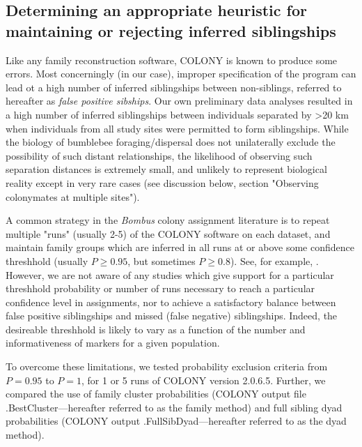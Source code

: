 \documentclass[12pt]{article}
\begin{document}
\subsection{Determining an appropriate heuristic for maintaining or rejecting inferred siblingships}

Like any family reconstruction software, COLONY is known to produce some errors. Most concerningly (in our case), improper specification of the program can lead ot a high number of inferred siblingships between non-siblings, referred to hereafter as \emph{false positive sibships}. Our own preliminary data analyses resulted in a high number of inferred siblingships between individuals separated by >20 km when individuals from all study sites were permitted to form siblingships. While the biology of bumblebee foraging/dispersal does not unilaterally exclude the possibility of such distant relationships, the likelihood of observing such separation distances is extremely small, and unlikely to represent biological reality except in very rare cases (see discussion below, section "Observing colonymates at multiple sites").

A common strategy in the \emph{Bombus} colony assignment literature is to repeat multiple "runs" (usually 2-5) of the COLONY software on each dataset, and maintain family groups which are inferred in all runs at or above some confidence threshhold (usually $P \ge 0.95$, but sometimes $P \ge 0.8$). See, for example, \textcite{carvellMolecularSpatialAnalyses2012, raoBumbleBeeHymenoptera2012, dreierFinescaleSpatialGenetic2014a, geibBumbleBeeNest2015a, carvellBumblebeeFamilyLineage2017a, molaWildfireRevealsTransient2020a}. However, we are not aware of any studies which give support for a particular threshhold probability or number of runs necessary to reach a particular confidence level in assignments, nor to achieve a satisfactory balance between false positive siblingships and missed (false negative) siblingships. Indeed, the desireable threshhold is likely to vary as a function of the number and informativeness of markers for a given population.

To overcome these limitations, we tested probability exclusion criteria from $P = 0.95$ to $P = 1$, for 1 or 5 runs of COLONY version 2.0.6.5. Further, we compared the use of family cluster probabilities (COLONY output file .BestCluster---hereafter referred to as the family method) and full sibling dyad probabilities (COLONY output .FullSibDyad---hereafter referred to as the dyad method).
\end{document}
